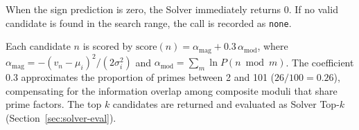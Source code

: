 When the sign prediction is zero, the Solver immediately returns 0. If no valid candidate is
found in the search range, the call is recorded as \texttt{none}.

Each candidate $n$ is scored by $\text{score}(n) = \alpha_{\text{mag}} + 0.3\,\alpha_{\text{mod}}$,
where $\alpha_{\text{mag}} = -(v_n-\mu_i)^2/(2\sigma_i^2)$ and
$\alpha_{\text{mod}} = \sum_{m}\ln P(n\bmod m)$.
The coefficient 0.3 approximates the proportion of primes between 2 and 101
($26/100 = 0.26$), compensating for the information overlap among composite moduli
that share prime factors.
The top $k$ candidates are returned and evaluated as Solver Top-$k$ (Section~\ref{sec:solver-eval}).
